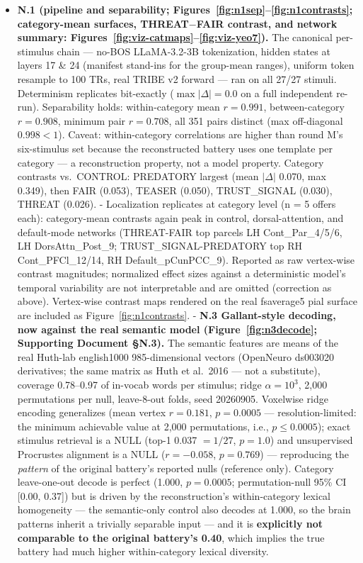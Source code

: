 \documentclass[11pt,twocolumn]{article}
\theoremstyle{plain}
\begin{document}
\begin{itemize}

\item \textbf{N.1 (pipeline and separability; Figures~\ref{fig:n1sep}--\ref{fig:n1contrasts}; category-mean surfaces, THREAT$-$FAIR contrast, and network summary: Figures~\ref{fig:viz-catmaps}--\ref{fig:viz-yeo7}).} The canonical per-stimulus chain --- no-BOS LLaMA-3.2-3B tokenization, hidden states at layers 17 \& 24 (manifest stand-ins for the group-mean ranges), uniform token resample to 100 TRs, real TRIBE v2 forward --- ran on all 27/27 stimuli. Determinism replicates bit-exactly ($\max|\Delta| = 0.0$ on a full independent re-run). Separability holds: within-category mean $r = 0.991$, between-category $r = 0.908$, minimum pair $r = 0.708$, all 351 pairs distinct (max off-diagonal $0.998 < 1$). Caveat: within-category correlations are higher than round M's six-stimulus set because the reconstructed battery uses one template per category --- a reconstruction property, not a model property. Category contrasts vs.\ CONTROL: PREDATORY largest (mean $|\Delta|$ 0.070, max 0.349), then FAIR (0.053), TEASER (0.050), TRUST\_SIGNAL (0.030), THREAT (0.026).
- Localization replicates at category level (n = 5 offers each): category-mean contrasts again peak in control, dorsal-attention, and default-mode networks (THREAT-FAIR top parcels LH Cont\_Par\_4/5/6, LH DorsAttn\_Post\_9; TRUST\_SIGNAL-PREDATORY top RH Cont\_PFCl\_12/14, RH Default\_pCunPCC\_9). Reported as raw vertex-wise contrast magnitudes; normalized effect sizes against a deterministic model's temporal variability are not interpretable and are omitted (correction as above). Vertex-wise contrast maps rendered on the real fsaverage5 pial surface are included as Figure~\ref{fig:n1contrasts}.
- \textbf{N.3 Gallant-style decoding, now against the real semantic model (Figure~\ref{fig:n3decode}; Supporting Document \S{}N.3).} The semantic features are means of the real Huth-lab english1000 985-dimensional vectors (OpenNeuro ds003020 derivatives; the same matrix as Huth et al.\ 2016 --- not a substitute), coverage 0.78--0.97 of in-vocab words per stimulus; ridge $\alpha = 10^{3}$, 2,000 permutations per null, leave-8-out folds, seed 20260905. Voxelwise ridge encoding generalizes (mean vertex $r = 0.181$, $p = 0.0005$ --- resolution-limited: the minimum achievable value at 2{,}000 permutations, i.e., $p \leq 0.0005$); exact stimulus retrieval is a NULL (top-1 0.037 $= 1/27$, $p = 1.0$) and unsupervised Procrustes alignment is a NULL ($r = -0.058$, $p = 0.769$) --- reproducing the \emph{pattern} of the original battery's reported nulls (reference only). Category leave-one-out decode is perfect (1.000, $p = 0.0005$; permutation-null 95\% CI [0.00, 0.37]) but is driven by the reconstruction's within-category lexical homogeneity --- the semantic-only control also decodes at 1.000, so the brain patterns inherit a trivially separable input --- and it is \textbf{explicitly not comparable to the original battery's 0.40}, which implies the true battery had much higher within-category lexical diversity.

\end{itemize}
\end{document}
